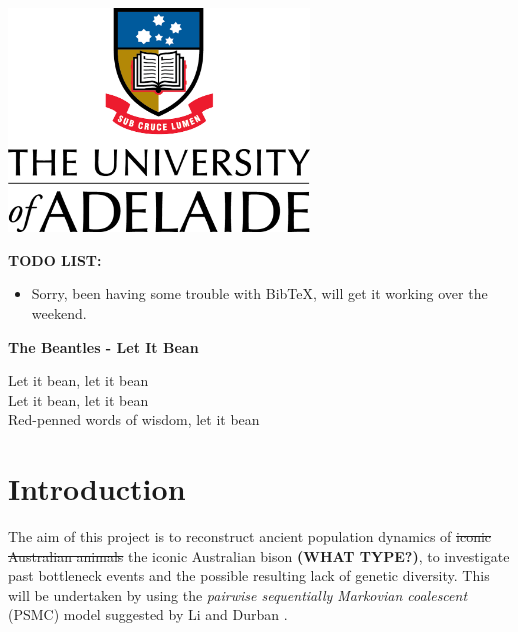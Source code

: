 \documentclass[12pt]{article}
\begin{document}
\begin{titlepage}
	\includegraphics[width=0.6\textwidth]{figures/UoA_logo}\\[1.5cm]
	\vfill %
	
\end{titlepage}

\thispagestyle{plain}


\newpage

\tableofcontents
\listofalgorithms
\listoffigures
\listoftables
\newpage


\textbf{TODO LIST:}
\begin{itemize}
\item Sorry, been having some trouble with BibTeX, will get it working over the weekend.
  \end{itemize}


  \begin{center}
  \textbf{The Beantles - Let It Bean}

Let it bean, let it bean\\
Let it bean, let it bean\\
Red-penned words of wisdom, let it bean
\end{center}

%

\section{Introduction}\label{sec:intro}
The aim of this project is to reconstruct ancient population dynamics of \sout{iconic Australian animals} the iconic Australian bison \textbf{(WHAT TYPE?)}, to investigate past bottleneck events and the possible resulting lack of genetic diversity. This will be undertaken by using the \emph{pairwise sequentially Markovian coalescent} (PSMC) model suggested by Li and Durban \cite{li2011inference}.
\end{document}
